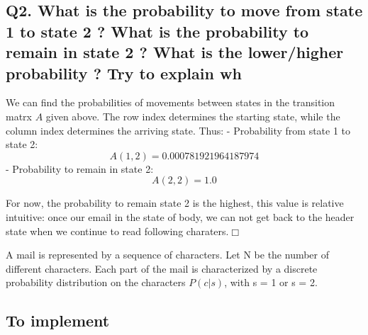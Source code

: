 \documentclass[11pt]{article}
\begin{document}
    \subsection{Q2. What is the probability to move from state 1 to state 2
? What is the probability to remain in state 2 ? What is the
lower/higher probability ? Try to explain
wh}\label{q2.-what-is-the-probability-to-move-from-state-1-to-state-2-what-is-the-probability-to-remain-in-state-2-what-is-the-lowerhigher-probability-try-to-explain-wh}

    We can find the probabilities of movements between states in the
transition matrx \(A\) given above. The row index determines the
starting state, while the column index determines the arriving state.
Thus: - Probability from state 1 to state 2:
\[ A(1,2) = 0.000781921964187974 \] - Probability to remain in state 2:
\[ A(2, 2) = 1.0 \]

    For now, the probability to remain state 2 is the highest, this value is
relative intuitive: once our email in the state of body, we can not get
back to the header state when we continue to read following
charaters.\(\Box\)

    A mail is represented by a sequence of characters. Let N be the number
of different characters. Each part of the mail is characterized by a
discrete probability distribution on the characters \(P(c|s)\), with s =
1 or s = 2.

    \subsection{To implement}\label{to-implement}
\end{document}
